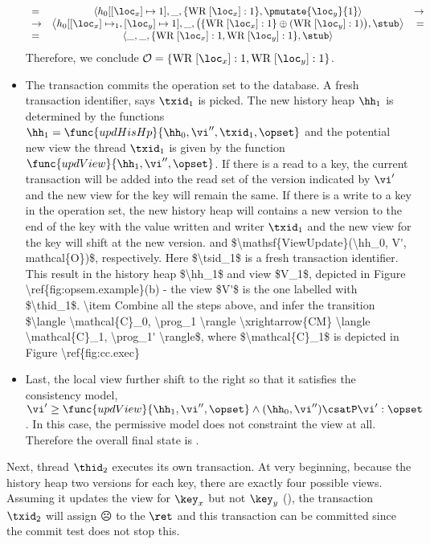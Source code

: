\begin{itemize}
{\begin{equation}
\begin{array}{lcr}
=&\left \langle h_0[[\loc_x] \mapsto 1], \_, \{\text{WR}\; [\loc_x]: 1\}, 
\pmutate{\loc_y}{1} \right\rangle 
&\rightarrow\\ 
\rightarrow & 
\left\langle h_0[[\loc_x] \mapsto_1, [\loc_y] \mapsto 1], \_, \big( \{\text{WR}\;[\loc_x]:1\} \oplus  (\text{WR}\;[\loc_y]: 1) \big), 
\stub \right\rangle & = \\
=& \left \langle \_, \_, \{\text{WR}\;[\loc_x]: 1, \text{WR}\;[\loc_y]:1 \}, \stub \right\rangle
\end{array}
\end{equation}
Therefore, we conclude $\mathcal{O} = \{\text{WR}\; [\loc_x] : 1, \text{WR}\;[\loc_y]:1\}$.
}
\item The transaction commits the operation set to the database.
A fresh transaction identifier, says \( \txid_{1} \) is picked.
The new history heap \( \hh_{1} \) is determined by the functions $\hh_{1} = \func{updHisHp}{\hh_0, \vi'',\txid_1, \opset}$ and the potential new view the thread \( \txid_{1}\) is given by the function  \( \func{updView}{\hh_1, \vi'' ,\opset}\).
If there is a read to a key, the current transaction will be added into the read set of the version indicated by \( \vi' \) and the new view for the key will remain the same.
If there is a write to a key in the operation set, the new history heap will contains a new version to the end of the key with the value written and writer \( \txid_{1} \) and the new view for the key  will shift at the new version.
\ac{
and  $\mathsf{ViewUpdate}(\hh_0, V', mathcal{O})$, respectively. Here $\tsid_1$ is a fresh transaction identifier. 
This result in the history heap $\hh_1$ and view $V_1$, depicted in 
Figure \ref{fig:opsem.example}(b) - the view $V'$ is the one labelled with $\thid_1$.
\item Combine all the steps above, and infer the transition $\langle \mathcal{C}_0, \prog_1 \rangle \xrightarrow{CM} 
\langle \mathcal{C}_1, \prog_1' \rangle$, where $\mathcal{C}_1$ is depicted in Figure \ref{fig:cc.exec} 
}
\item Last, the local view further shift to the right so that it satisfies the consistency model, \( \vi' \geq \func{updView}{\hh_1, \vi'' ,\opset} \land (\hh_{0}, \vi'') \csatP \vi' : \opset \).
In this case, the permissive model does not constraint the view at all.
Therefore the overall final state is .
\end{itemize}

Next, thread $\thid_2$ executes its own transaction. 
At very beginning, because the history heap two versions for each key, there are exactly four possible views.
Assuming it updates the view for \( \key_{x} \) but not \( \key_y \) (), the transaction \( \txid_{2} \) will assign \(\sadface\) to the \( \ret\) and this transaction can be committed since the commit test does not stop this.

